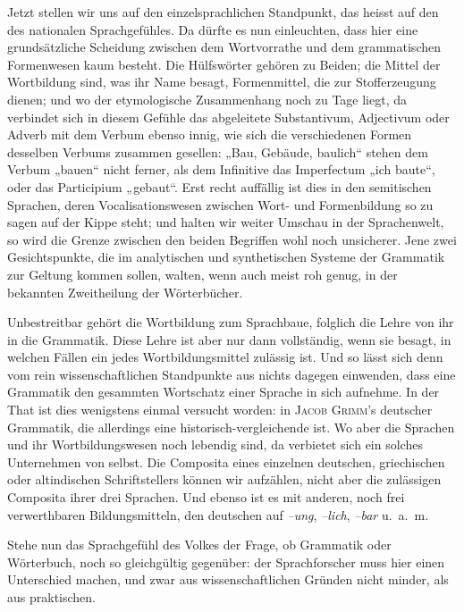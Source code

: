 Jetzt stellen wir uns auf den einzelsprachlichen Standpunkt, das heisst auf den des nationalen Sprachgefühles. Da dürfte es nun einleuchten, dass hier eine grundsätzliche Scheidung zwischen dem Wortvorrathe und dem grammatischen Formenwesen kaum besteht. Die Hülfswörter gehören zu Beiden; die Mittel der Wortbildung sind, was ihr Name besagt, Formenmittel, die zur \label{sp.122} Stofferzeugung dienen; und wo der etymologische Zusammenhang noch zu Tage liegt, da verbindet sich in diesem Gefühle das abgeleitete Substantivum, Adjectivum oder Adverb mit dem Verbum ebenso innig, wie sich die verschiedenen Formen desselben Verbums zusammen gesellen: „Bau, Gebäude, baulich“ stehen dem Verbum „bauen“ nicht ferner, als dem Infinitive das Imperfectum „ich baute“, oder das Participium „gebaut“. Erst recht auffällig ist dies in den semitischen Sprachen, deren Vocalisationswesen zwischen Wort- und Formenbildung so zu sagen auf der Kippe steht; und halten wir weiter Umschau in der Sprachenwelt, so wird die Grenze zwischen den beiden Begriffen wohl noch unsicherer. Jene zwei Gesichtspunkte, die im analytischen und synthetischen Systeme der Grammatik zur Geltung kommen sollen, walten, wenn auch meist roh genug, in der bekannten Zweitheilung der Wörterbücher.

Unbestreitbar gehört die Wortbildung zum Sprachbaue, folglich die Lehre von ihr in die Grammatik. Diese Lehre ist aber nur dann vollständig, wenn sie besagt, in welchen Fällen ein jedes Wortbildungsmittel zulässig ist. Und so lässt sich denn vom rein wissenschaftlichen Standpunkte aus nichts dagegen einwenden, dass eine Grammatik den gesammten Wortschatz einer Sprache in sich aufnehme. In der That ist dies wenigstens einmal versucht worden: in \textsc{Jacob Grimm}’s deutscher Grammatik, die allerdings eine historisch-vergleichende ist. Wo aber die Sprachen und ihr Wortbildungswesen noch lebendig sind, da verbietet sich ein solches Unternehmen von selbst. Die Composita eines einzelnen deutschen, griechischen oder altindischen Schriftstellers können wir aufzählen, nicht aber die zulässigen Composita ihrer drei Sprachen. Und ebenso ist es mit anderen, noch frei verwerthbaren Bildungsmitteln, den deutschen auf \textit{–ung}, \textit{–lich}, \textit{–bar} u.~a.~m.

Stehe nun das Sprachgefühl des Volkes der Frage, ob Grammatik oder Wörterbuch, noch so gleichgültig gegenüber: der Sprachforscher \label{fp.130} muss hier einen Unterschied machen, und zwar aus wissenschaftlichen Gründen nicht minder, als aus praktischen.

